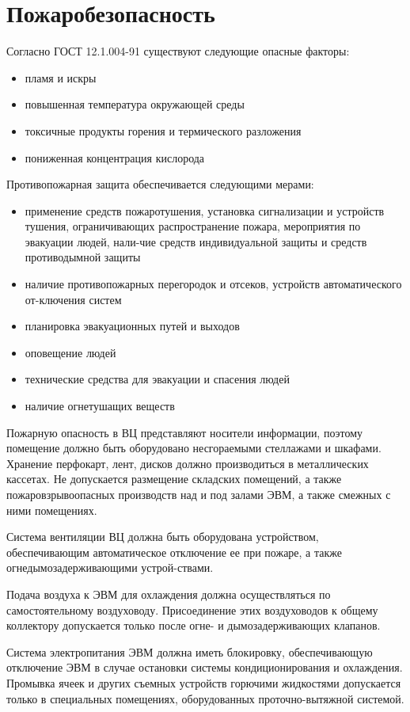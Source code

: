 \documentclass[12pt,a4paper]{report}
\begin{document}
\section{Пожаробезопасность}
Согласно ГОСТ 12.1.004-91 существуют следующие опасные факторы:
\begin{itemize}
\item пламя и искры
\item повышенная температура окружающей среды
\item токсичные продукты горения и термического разложения
\item пониженная концентрация кислорода
\end{itemize}
Противопожарная защита обеспечивается следующими мерами:
\begin{itemize}
\item применение средств пожаротушения, установка сигнализации и устройств тушения, ограничивающих распространение пожара, мероприятия по эвакуации людей, нали-чие средств индивидуальной защиты и средств противодымной защиты
\item наличие противопожарных перегородок и отсеков, устройств автоматического от-ключения систем
\item планировка эвакуационных путей и выходов
\item оповещение людей
\item технические средства для эвакуации и спасения людей
\item наличие огнетушащих веществ
\end{itemize}

Пожарную опасность в ВЦ представляют носители информации, поэтому помещение должно быть оборудовано несгораемыми стеллажами и шкафами. Хранение перфокарт, лент, дисков должно производиться в металлических кассетах. Не допускается размещение складских помещений, а также пожаровзрывоопасных производств над и под залами ЭВМ, а также смежных с ними помещениях.

Система вентиляции ВЦ должна быть оборудована устройством, обеспечивающим автоматическое отключение ее при пожаре, а также огнедымозадерживающими устрой-ствами.

Подача воздуха к ЭВМ для охлаждения должна осуществляться по самостоятельному воздуховоду. Присоединение этих воздуховодов к общему коллектору допускается только после огне- и дымозадерживающих клапанов.

Система электропитания ЭВМ должна иметь блокировку, обеспечивающую отключение ЭВМ в случае остановки системы кондиционирования и охлаждения. Промывка ячеек и других съемных устройств горючими жидкостями допускается только в специальных помещениях, оборудованных проточно-вытяжной системой.
\end{document}
